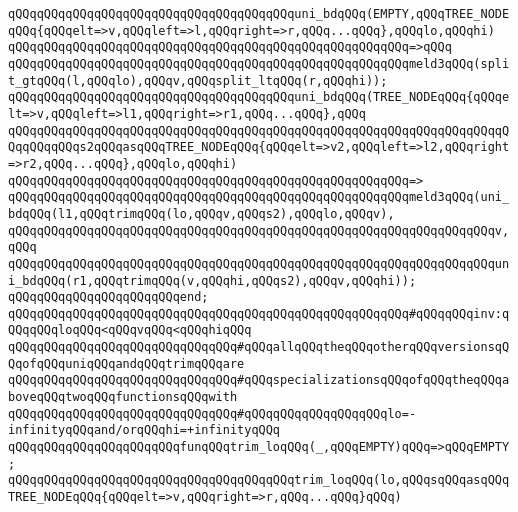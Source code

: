 \verb|qQQqqQQqqQQqqQQqqQQqqQQqqQQqqQQqqQQqqQQquni_bdqQQq(EMPTY,qQQqTREE_NODEqQQq{qQQqelt=>v,qQQqleft=>l,qQQqright=>r,qQQq...qQQq},qQQqlo,qQQqhi)|\newline
\verb|qQQqqQQqqQQqqQQqqQQqqQQqqQQqqQQqqQQqqQQqqQQqqQQqqQQqqQQq=>qQQq|\newline
\verb|qQQqqQQqqQQqqQQqqQQqqQQqqQQqqQQqqQQqqQQqqQQqqQQqqQQqqQQqmeld3qQQq(split_gtqQQq(l,qQQqlo),qQQqv,qQQqsplit_ltqQQq(r,qQQqhi));|\newline
\newline
\verb|qQQqqQQqqQQqqQQqqQQqqQQqqQQqqQQqqQQqqQQquni_bdqQQq(TREE_NODEqQQq{qQQqelt=>v,qQQqleft=>l1,qQQqright=>r1,qQQq...qQQq},qQQq|\newline
\verb|qQQqqQQqqQQqqQQqqQQqqQQqqQQqqQQqqQQqqQQqqQQqqQQqqQQqqQQqqQQqqQQqqQQqqQQqqQQqqQQqs2qQQqasqQQqTREE_NODEqQQq{qQQqelt=>v2,qQQqleft=>l2,qQQqright=>r2,qQQq...qQQq},qQQqlo,qQQqhi)|\newline
\verb|qQQqqQQqqQQqqQQqqQQqqQQqqQQqqQQqqQQqqQQqqQQqqQQqqQQqqQQq=>|\newline
\verb|qQQqqQQqqQQqqQQqqQQqqQQqqQQqqQQqqQQqqQQqqQQqqQQqqQQqqQQqmeld3qQQq(uni_bdqQQq(l1,qQQqtrimqQQq(lo,qQQqv,qQQqs2),qQQqlo,qQQqv),|\newline
\verb|qQQqqQQqqQQqqQQqqQQqqQQqqQQqqQQqqQQqqQQqqQQqqQQqqQQqqQQqqQQqqQQqqQQqv,qQQq|\newline
\verb|qQQqqQQqqQQqqQQqqQQqqQQqqQQqqQQqqQQqqQQqqQQqqQQqqQQqqQQqqQQqqQQqqQQquni_bdqQQq(r1,qQQqtrimqQQq(v,qQQqhi,qQQqs2),qQQqv,qQQqhi));|\newline
\verb|qQQqqQQqqQQqqQQqqQQqqQQqend;|\newline
\verb|qQQqqQQqqQQqqQQqqQQqqQQqqQQqqQQqqQQqqQQqqQQqqQQqqQQqqQQq#qQQqqQQqinv:qQQqqQQqloqQQq<qQQqvqQQq<qQQqhiqQQq|\newline
\newline
\verb|qQQqqQQqqQQqqQQqqQQqqQQqqQQqqQQq#qQQqallqQQqtheqQQqotherqQQqversionsqQQqofqQQquniqQQqandqQQqtrimqQQqare|\newline
\verb|qQQqqQQqqQQqqQQqqQQqqQQqqQQqqQQq#qQQqspecializationsqQQqofqQQqtheqQQqaboveqQQqtwoqQQqfunctionsqQQqwith|\newline
\verb|qQQqqQQqqQQqqQQqqQQqqQQqqQQqqQQq#qQQqqQQqqQQqqQQqqQQqlo=-infinityqQQqand/orqQQqhi=+infinityqQQq|\newline
\newline
\newline
\verb|qQQqqQQqqQQqqQQqqQQqqQQqfunqQQqtrim_loqQQq(_,qQQqEMPTY)qQQq=>qQQqEMPTY;|\newline
\newline
\verb|qQQqqQQqqQQqqQQqqQQqqQQqqQQqqQQqqQQqqQQqtrim_loqQQq(lo,qQQqsqQQqasqQQqTREE_NODEqQQq{qQQqelt=>v,qQQqright=>r,qQQq...qQQq}qQQq)|\newline
